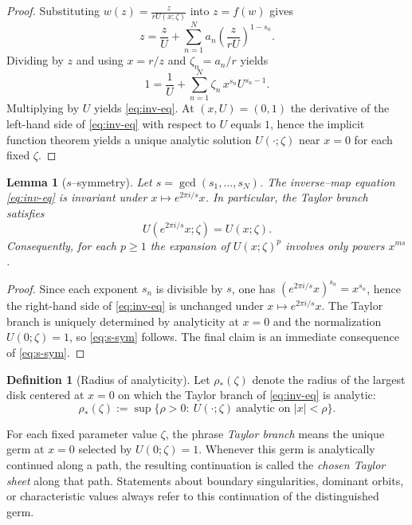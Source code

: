 \documentclass[11pt]{amsart}
\numberwithin{equation}{section}
\theoremstyle{plain}
\newtheorem{lemma}[theorem]{Lemma}
\theoremstyle{definition}
\newtheorem{definition}[theorem]{Definition}
\theoremstyle{remark}
\begin{document}
\begin{proof}
	Substituting $w(z)=\frac{z}{rU(x;\zeta)}$ into $z=f(w)$ gives
	\[
		z=\frac{z}{U}+\sum_{n=1}^{N}a_n\left(\frac{z}{rU}\right)^{1-s_n}.
	\]
	Dividing by $z$ and using $x=r/z$ and $\zeta_n=a_n/r$ yields
	\[
		1=\frac{1}{U}+\sum_{n=1}^{N}\zeta_n\,x^{s_n} U^{s_n-1}.
	\]
	Multiplying by $U$ yields \eqref{eq:inv-eq}. At $(x,U)=(0,1)$ the derivative of the left-hand side
	of \eqref{eq:inv-eq} with respect to $U$ equals $1$, hence the implicit function theorem yields a
	unique analytic solution $U(\cdot;\zeta)$ near $x=0$ for each fixed $\zeta$.
\end{proof}

\begin{lemma}[$s$--symmetry]\label{lem:s-symmetry}
	Let $s=\gcd(s_1,\dots,s_N)$. The inverse--map equation \eqref{eq:inv-eq} is invariant under
	$x\mapsto e^{2\pi i/s}x$. In particular, the Taylor branch satisfies
	\begin{equation}\label{eq:s-sym}
		U(e^{2\pi i/s}x;\zeta)=U(x;\zeta).
	\end{equation}
	Consequently, for each $p\ge1$ the expansion of $U(x;\zeta)^p$ involves only powers $x^{ms}$.
\end{lemma}

\begin{proof}
	Since each exponent $s_n$ is divisible by $s$, one has $(e^{2\pi i/s}x)^{s_n}=x^{s_n}$, hence the
	right-hand side of \eqref{eq:inv-eq} is unchanged under $x\mapsto e^{2\pi i/s}x$.
	The Taylor branch is uniquely determined by analyticity at $x=0$ and the normalization $U(0;\zeta)=1$,
	so \eqref{eq:s-sym} follows. The final claim is an immediate consequence of \eqref{eq:s-sym}.
\end{proof}

\begin{definition}[Radius of analyticity]\label{def:rho-star}
	Let $\rho_*(\zeta)$ denote the radius of the largest disk centered at $x=0$ on which the Taylor
	branch of \eqref{eq:inv-eq} is analytic:
	\begin{equation}\label{eq:rho-star}
		\rho_*(\zeta):=\sup\{\rho>0:\ U(\cdot;\zeta)\ \text{analytic on }|x|<\rho\}.
	\end{equation}
\end{definition}


For each fixed parameter value \(\zeta\), the phrase \emph{Taylor branch}
means the unique germ at \(x=0\) selected by \(U(0;\zeta)=1\). Whenever this
germ is analytically continued along a path, the resulting continuation is
called the \emph{chosen Taylor sheet} along that path. Statements about
boundary singularities, dominant orbits, or characteristic values always refer
to this continuation of the distinguished germ.
\end{document}
